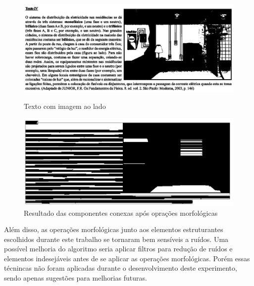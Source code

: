 \documentclass{article}
\begin{document}
\begin{figure}[!htb]
  \begin{minipage}{0.48\textwidth}
    \centering
    \includegraphics[width=.99\linewidth]{erro2.png}
    \caption{Texto com imagem ao lado}\label{Fig:original3}
  \end{minipage}\hfill
  \begin{minipage}{0.48\textwidth}
    \centering
    \includegraphics[width=.99\linewidth]{erro1.png}
    \caption{Resultado das componentes conexas após oprações morfológicas}\label{Fig:erro3}
  \end{minipage}
\end{figure}

Além disso, as operações morfológicas junto aos elementos estruturantes escolhidos durante este trabalho se tornaram bem sensíveis a ruídos. Uma possível melhoria do algoritmo seria aplicar filtros para redução de ruídos e elementos indesejáveis antes de se aplicar as operações morfológicas. Porém essas técnincas não foram aplicadas durante o desenvolvimento deste experimento, sendo apenas sugestões para melhorias futuras.



\end{document}
